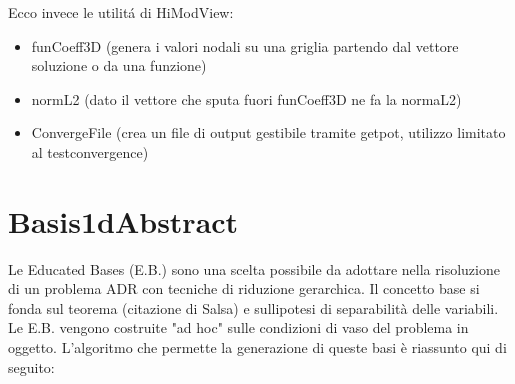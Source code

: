 Ecco invece le utilit\'a di HiModView:
\begin{itemize}
\item funCoeff3D (genera i valori nodali su una griglia partendo dal vettore soluzione o da una funzione)
\item normL2 (dato il vettore che sputa fuori funCoeff3D ne fa la normaL2)
\item ConvergeFile (crea un file di output gestibile tramite getpot, utilizzo limitato al testconvergence)
\end{itemize}


\section{Basis1dAbstract}

Le Educated Bases (E.B.) sono una scelta possibile da adottare nella risoluzione di un problema ADR con tecniche di riduzione gerarchica. Il concetto base si fonda sul teorema (citazione di Salsa) e sullipotesi di separabilit\`a delle variabili. Le E.B. vengono costruite "ad hoc" sulle condizioni di vaso del problema in oggetto. L'algoritmo che permette la generazione di queste basi \`e riassunto qui di seguito:

